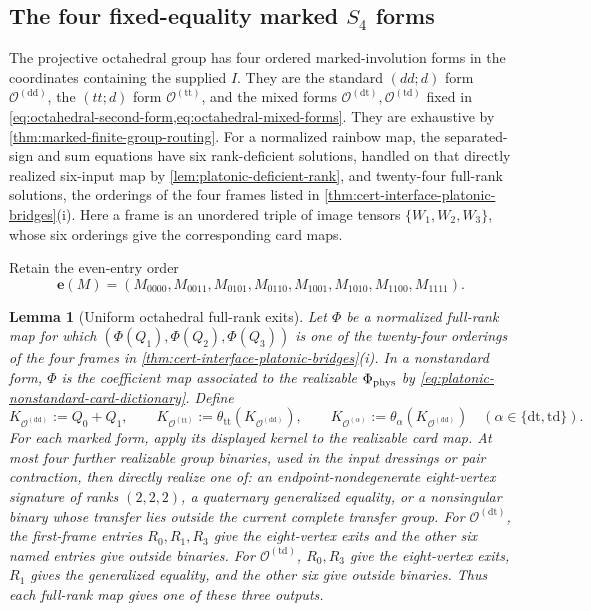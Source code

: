 \documentclass[11pt,letterpaper,onecolumn]{article}
\theoremstyle{plain}
\newtheorem{lemma}[lemma]{Lemma}
\theoremstyle{definition}
\theoremstyle{remark}
\newcommand{\OctDD}{{\mathcal O^{(\mathrm{dd})}}}
\newcommand{\OctTT}{{\mathcal O^{(\mathrm{tt})}}}
\newcommand{\OctDT}{{\mathcal O^{(\mathrm{dt})}}}
\newcommand{\OctTD}{{\mathcal O^{(\mathrm{td})}}}
\newcommand{\OctForm}[1]{{\mathcal O^{(#1)}}}
\begin{document}
\subsection{The four fixed-equality marked \texorpdfstring{\(S_4\)}{S4} forms}

The projective octahedral group has four ordered marked-involution forms in
the coordinates containing the supplied \(I\).  They are the
standard \((dd;d)\) form \(\OctDD\), the \((tt;d)\) form
\(\OctTT\), and the mixed forms
\(\OctDT,\OctTD\) fixed in
\cref{eq:octahedral-second-form,eq:octahedral-mixed-forms}.  They are
exhaustive by \cref{thm:marked-finite-group-routing}.  For a normalized rainbow map, the separated-sign and sum equations have
six rank-deficient solutions,
handled on that directly realized six-input map by
\cref{lem:platonic-deficient-rank}, and twenty-four full-rank solutions, the orderings of the
four frames listed in
\cref{thm:cert-interface-platonic-bridges}\textnormal{(i)}. Here a frame is
an unordered triple of image tensors \(\{W_1,W_2,W_3\}\), whose six
orderings give the corresponding card maps.

Retain the even-entry order
\begin{equation}
  \mathbf e(M)=
  (M_{0000},M_{0011},M_{0101},M_{0110},
   M_{1001},M_{1010},M_{1100},M_{1111}).
  \label{eq:octahedral-even-order}
\end{equation}

\begin{lemma}[Uniform octahedral full-rank exits]
\label{lem:octahedral-separator}
Let \(\Phi\) be a normalized full-rank map for which
\((\Phi(Q_1),\Phi(Q_2),\Phi(Q_3))\) is one of the twenty-four orderings of
the four frames in
\cref{thm:cert-interface-platonic-bridges}\textnormal{(i)}.  In a nonstandard
form, \(\Phi\) is the coefficient map associated to the realizable
\(\Phi_{\rm phys}\) by \cref{eq:platonic-nonstandard-card-dictionary}.
Define
\[
 K_{\OctDD}:=Q_0+Q_1,\qquad
 K_{\OctTT}:=\theta_{\mathrm{tt}}(K_{\OctDD}),\qquad
 K_{\OctForm{\alpha}}:=\theta_\alpha(K_{\OctDD})
 \quad(\alpha\in\{\mathrm{dt},\mathrm{td}\}).
\]
For each marked form, apply its displayed kernel to the realizable card map.
At most four further realizable group binaries, used in the input
dressings or pair contraction, then directly realize one of:
an endpoint-nondegenerate eight-vertex signature of ranks \((2,2,2)\), a
quaternary generalized equality, or a nonsingular binary whose transfer
lies outside the current complete transfer group.  For \(\OctDT\), the
first-frame entries \(R_0,R_1,R_3\) give the eight-vertex exits and the
other six named entries give outside binaries.  For
\(\OctTD\), \(R_0,R_3\) give the eight-vertex exits, \(R_1\)
gives the generalized equality, and the other six give outside
binaries.  Thus each full-rank map gives one of these three outputs.
\end{lemma}
\end{document}
